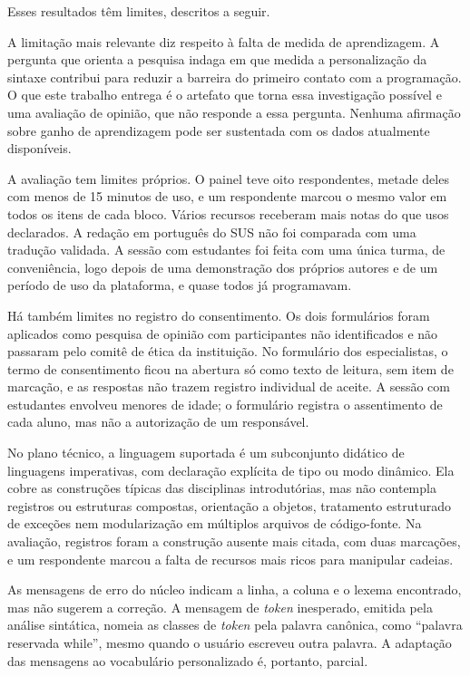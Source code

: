 Esses resultados têm limites, descritos a seguir.

A limitação mais relevante diz respeito à falta de medida de aprendizagem. A pergunta que orienta a pesquisa indaga em que medida a personalização da sintaxe contribui para reduzir a barreira do primeiro contato com a programação. O que este trabalho entrega é o artefato que torna essa investigação possível e uma avaliação de opinião, que não responde a essa pergunta. Nenhuma afirmação sobre ganho de aprendizagem pode ser sustentada com os dados atualmente disponíveis.

A avaliação tem limites próprios. O painel teve oito respondentes, metade deles com menos de 15 minutos de uso, e um respondente marcou o mesmo valor em todos os itens de cada bloco. Vários recursos receberam mais notas do que usos declarados. A redação em português do SUS não foi comparada com uma tradução validada. A sessão com estudantes foi feita com uma única turma, de conveniência, logo depois de uma demonstração dos próprios autores e de um período de uso da plataforma, e quase todos já programavam.

Há também limites no registro do consentimento. Os dois formulários foram aplicados como pesquisa de opinião com participantes não identificados e não passaram pelo comitê de ética da instituição. No formulário dos especialistas, o termo de consentimento ficou na abertura só como texto de leitura, sem item de marcação, e as respostas não trazem registro individual de aceite. A sessão com estudantes envolveu menores de idade; o formulário registra o assentimento de cada aluno, mas não a autorização de um responsável.

No plano técnico, a linguagem suportada é um subconjunto didático de linguagens imperativas, com declaração explícita de tipo ou modo dinâmico. Ela cobre as construções típicas das disciplinas introdutórias, mas não contempla registros ou estruturas compostas, orientação a objetos, tratamento estruturado de exceções nem modularização em múltiplos arquivos de código-fonte. Na avaliação, registros foram a construção ausente mais citada, com duas marcações, e um respondente marcou a falta de recursos mais ricos para manipular cadeias.

As mensagens de erro do núcleo indicam a linha, a coluna e o lexema encontrado, mas não sugerem a correção. A mensagem de \textit{token} inesperado, emitida pela análise sintática, nomeia as classes de \textit{token} pela palavra canônica, como ``palavra reservada while'', mesmo quando o usuário escreveu outra palavra. A adaptação das mensagens ao vocabulário personalizado é, portanto, parcial.


